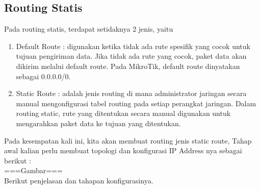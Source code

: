 \subsection{Routing Statis}
Pada routing statis, terdapat setidaknya 2 jenis, yaitu
\begin{enumerate}
	\item Default Route : digunakan ketika tidak ada rute spesifik yang cocok untuk tujuan pengiriman data. Jika tidak ada rute yang cocok, paket data akan dikirim melalui default route. Pada MikroTik, default route dinyatakan sebagai 0.0.0.0/0.
	\item Static Route : adalah jenis routing di mana administrator jaringan secara manual mengonfigurasi tabel routing pada setiap perangkat jaringan. Dalam routing static, rute yang ditentukan secara manual digunakan untuk mengarahkan paket data ke tujuan yang ditentukan.
\end{enumerate}
Pada kesempatan kali ini, kita akan membuat routing jenis static route, Tahap awal kalian
perlu membuat topologi dan konfigurasi IP Address nya sebagai berikut :\\
===Gambar===\\Berikut penjelasan dan tahapan konfigurasinya.
